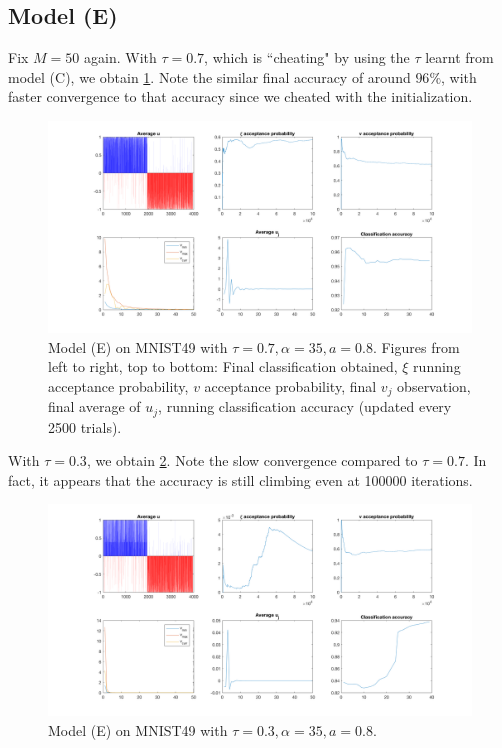 \documentclass{siamart1116}
\begin{document}
    \subsection{Model (E)}
        Fix $M=50$ again. 
        With $\tau = 0.7$, which is ``cheating" by using the $\tau$ learnt from model (C), we obtain \cref{fig:model_e_mnist_t=0.7}. Note the similar final accuracy of around $96\%$, with faster convergence to that accuracy since we cheated with the initialization.
        \begin{figure}[!htb]
            \centering
            \caption{\label{fig:model_e_mnist_t=0.7}Model (E) on MNIST49 with $\tau=0.7,\alpha=35,a=0.8$. Figures from left to right, top to bottom: Final classification obtained, $\xi$ running acceptance probability, $v$ acceptance probability, final $v_j$ observation, final average of $u_j$, running classification accuracy (updated every 2500 trials).}
            \includegraphics[width=0.8\linewidth]{model_c_vs_model_e/mnist/learn_v/t=0_7.png}
        \end{figure}

        With $\tau = 0.3$, we obtain \cref{fig:model_e_mnist_t=0.3}. Note the slow convergence compared to $\tau=0.7$. In fact, it appears that the accuracy is still climbing even at 100000 iterations.
        \begin{figure}[!htb]
            \centering
            \caption{\label{fig:model_e_mnist_t=0.3}Model (E) on MNIST49 with $\tau=0.3,\alpha=35,a=0.8$.}
            \includegraphics[width=0.8\linewidth]{model_c_vs_model_e/mnist/learn_v/t=0_3.png}
        \end{figure}
\end{document}
